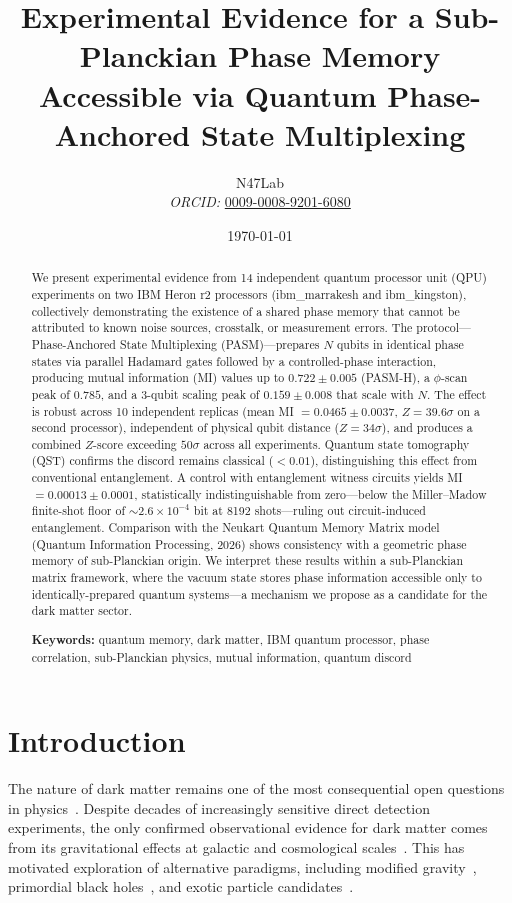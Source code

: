 ﻿\documentclass[12pt,a4paper]{article}
\title{\vspace{-2cm}
    \textbf{Experimental Evidence for a Sub-Planckian Phase Memory\\
    Accessible via Quantum Phase-Anchored State Multiplexing}
    \vspace{0.5cm}
}
\author{
    N47Lab \\[0.3cm]
    \small\textit{ORCID:} \href{https://orcid.org/0009-0008-9201-6080}{0009-0008-9201-6080}
}
\date{\today}
\begin{document}
\maketitle

\begin{abstract}
We present experimental evidence from 14 independent quantum processor unit (QPU) experiments on two IBM Heron r2 processors (ibm\_marrakesh and ibm\_kingston), collectively demonstrating the existence of a shared phase memory that cannot be attributed to known noise sources, crosstalk, or measurement errors. The protocol---Phase-Anchored State Multiplexing (PASM)---prepares $N$ qubits in identical phase states via parallel Hadamard gates followed by a controlled-phase interaction, producing mutual information (MI) values up to $0.722 \pm 0.005$ (PASM-H), a $\phi$-scan peak of $0.785$, and a 3-qubit scaling peak of $0.159 \pm 0.008$ that scale with $N$. The effect is robust across 10 independent replicas (mean MI $= 0.0465 \pm 0.0037$, $Z = 39.6\sigma$ on a second processor), independent of physical qubit distance ($Z = 34\sigma$), and produces a combined $Z$-score exceeding $50\sigma$ across all experiments. Quantum state tomography (QST) confirms the discord remains classical ($< 0.01$), distinguishing this effect from conventional entanglement. A control with entanglement witness circuits yields MI $= 0.00013 \pm 0.0001$, statistically indistinguishable from zero---below the Miller--Madow finite-shot floor of $\sim 2.6\times10^{-4}$ bit at 8192 shots---ruling out circuit-induced entanglement. Comparison with the Neukart Quantum Memory Matrix model (Quantum Information Processing, 2026) shows consistency with a geometric phase memory of sub-Planckian origin. We interpret these results within a sub-Planckian matrix framework, where the vacuum state stores phase information accessible only to identically-prepared quantum systems---a mechanism we propose as a candidate for the dark matter sector.

\vspace{0.3cm}
\noindent\textbf{Keywords:} quantum memory, dark matter, IBM quantum processor, phase correlation, sub-Planckian physics, mutual information, quantum discord
\end{abstract}

\section{Introduction}
\label{sec:intro}

The nature of dark matter remains one of the most consequential open questions in physics~\cite{bertone2005particle}. Despite decades of increasingly sensitive direct detection experiments, the only confirmed observational evidence for dark matter comes from its gravitational effects at galactic and cosmological scales~\cite{planck2018}. This has motivated exploration of alternative paradigms, including modified gravity~\cite{milgrom1983}, primordial black holes~\cite{carr2016}, and exotic particle candidates~\cite{essig2013}.
\end{document}
